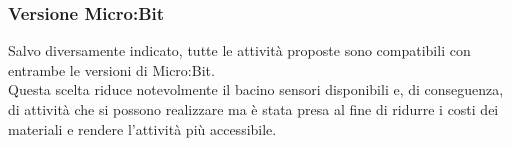 \documentclass[../../relazione.tex]{subfiles}
\begin{document}
\subsubsection{Versione Micro:Bit}
Salvo diversamente indicato, tutte le attività proposte sono compatibili con entrambe le versioni di Micro:Bit.\\
Questa scelta riduce notevolmente il bacino sensori disponibili e, di conseguenza, di attività che si possono realizzare ma è stata presa al fine di ridurre i costi dei materiali e rendere l'attività più accessibile.
\end{document}
